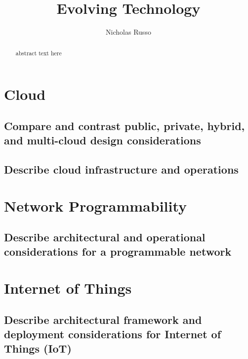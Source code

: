 \documentclass{article}
\author{Nicholas Russo}
\title{Evolving Technology}
\date{}
\begin{document}
\maketitle

\newpage
\begin{abstract}
abstract text here
\end{abstract}

\newpage
\tableofcontents
\listoffigures
\listoftables

\newpage
\section{Cloud}
\subsection{Compare and contrast public, private, hybrid, and multi-cloud design considerations}




\subsection{Describe cloud infrastructure and operations}





\newpage
\section{Network Programmability}
\subsection{Describe architectural and operational considerations for a programmable network}





\newpage
\section{Internet of Things}
\subsection{Describe architectural framework and deployment considerations for Internet of Things (IoT)}




\end{document}
